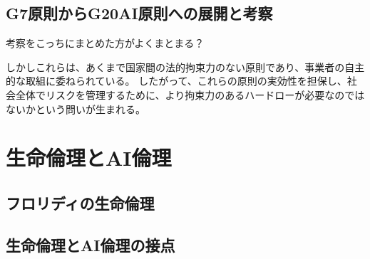\subsection{G7原則からG20AI原則への展開と考察}

考察をこっちにまとめた方がよくまとまる？

しかしこれらは、あくまで国家間の法的拘束力のない原則であり、事業者の自主的な取組に委ねられている。
したがって、これらの原則の実効性を担保し、社会全体でリスクを管理するために、より拘束力のあるハードローが必要なのではないかという問いが生まれる。


\section{生命倫理とAI倫理} %

\subsection{フロリディの生命倫理}

\subsection{生命倫理とAI倫理の接点}





